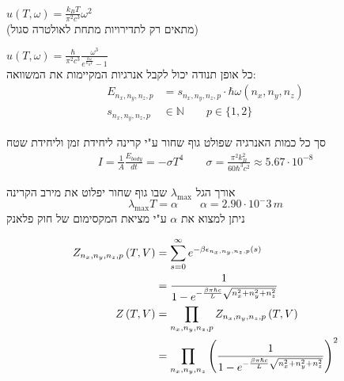 \begin{cheatformula}
$
    u(T,\omega) = \frac{k_B T}{\pi^2 c^3} \omega^2
$ \\
(מתאים רק לתדירויות מתחת לאולטרה סגול)

\end{cheatformula}

\begin{cheatformula}
$
    u(T,\omega) = \frac{\hbar}{\pi^2 c^3} \frac{\omega ^3}{e^{\frac{\hbar \omega}{k_B T}}-1}
$ \\
כל אופן תנודה יכול לקבל אנרגיות המקיימות את המשוואה:
\begin{align*}
E_{n_x,n_y,n_z,p} &= s_{n_x,n_y,n_z,p} \cdot \hbar \omega(n_x,n_y,n_z) \\
s_{n_x,n_y,n_z,p} &\in \mathbb{N} \qquad p \in \{1,2\}
\end{align*}

\end{cheatformula}
\begin{cheatformula}
סך כל כמות האנרגיה שפולט גוף שחור ע"י קרינה ליחידת זמן וליחידת שטח
\begin{align*}
    I = \frac{1}{A} \frac{E_{body}}{dt} = -\sigma T^4 \qquad \sigma = \frac{\pi ^2 k_B ^2}{60\hbar ^3 c^2} \approx 5.67 \cdot 10^{-8}
\end{align*}
\end{cheatformula}

\begin{cheatformula}
    אורך הגל $\lambda_{\max}$ שבו גוף שחור יפלוט את מירב הקרינה
    $$\lambda_{\max} T = \alpha \qquad \alpha = 2.90 \cdot 10^-3 \, m$$
    ניתן למצוא את $\alpha$ ע"י מציאת המקסימום של חוק פלאנק 
\end{cheatformula}

\begin{cheatformula}
\begin{align*}
Z_{n_x,n_y,n_z,p} \left(T,V\right) &= \sum_{s=0}^\infty e^{-\beta \epsilon_{n_x,n_y,n_z,p}(s)} \\
&= \frac{1}{1-e^{-\frac{\beta \pi \hbar c}{L}\sqrt{n_x^2 + n_y^2 + n_z^2}}} \\
Z\left(T,V\right) &= \prod_{\tiny n_x,n_y,n_z,p} Z_{\tiny n_x,n_y,n_z,p} \left(T,V\right) \\
&= \prod_{\tiny n_x,n_y,n_z} \left(\frac{1}{1-e^{-\frac{\beta \pi \hbar c}{L}\sqrt{n_x^2 + n_y^2 + n_z^2}}}\right)^2
\end{align*}
\end{cheatformula}
